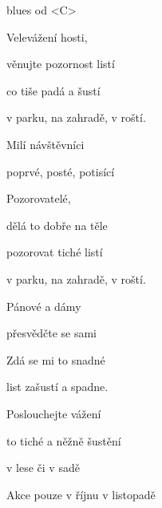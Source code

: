 

blues od <C> 

\zs
Velevážení hosti,

věnujte pozornost listí

co tiše padá a šustí

v parku, na zahradě, v roští.
\ks

\zr
Milí návštěvníci

poprvé, posté, potisící
\kr

\zs
Pozorovatelé,

dělá to dobře na těle

pozorovat tiché listí

v parku, na zahradě, v roští.
\ks

\zr
\kr

\zs
Pánové a dámy

přesvědčte se sami

Zdá se mi to snadné 

list zašustí a spadne.
\ks

\zr
\kr

\zs
Poslouchejte vážení

to tiché a něžně šustění

v lese či v sadě

Akce pouze v říjnu v listopadě
\ks

\kp
